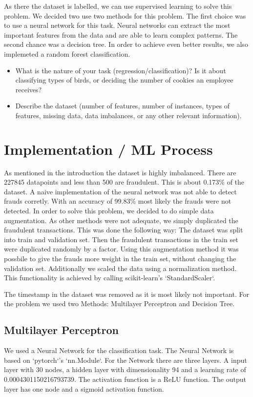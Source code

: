 \documentclass[a4paper, 10pt, conference]{ieeeconf}      %
\begin{document}
As there the dataset is labelled, we can use supervised learning to solve this problem. We decided two use two methods for this problem. 
The first choice was to use a neural network for this task. Neural networks can extract the most important features from the data and are able to learn complex patterns. 
The second chance was a decision tree. In order to achieve even better results, we also implemeted a random forest classification.


 
{\color{blue}

\begin{itemize}
	\item What is the nature of your task (regression/classification)? Is it about classifying types of birds, or deciding the number of cookies an employee receives?
	\item Describe the dataset (number of features, number of instances, types of features, missing data, data imbalances, or any other relevant information).
\end{itemize}
}


\section{Implementation / ML Process}
\label{sec:methods}
As mentioned in the introduction the dataset is highly imbalanced. There are 227845 datapoints and less than 500 are fraudulent. This is about 0.173\% of the dataset. 
A naive implementation of the neural network was not able to detect frauds corretly. With an accuracy of 99.83\% most likely the frauds were not detected. 
In order to solve this problem, we decided to do simple data augmentation. As other methods were not adequate, we simply duplicated the fraudulent transactions.
This was done the following way: The dataset was split into train and validation set. Then the fraudulent transactions in the train set were duplicated randomly by a factor. 
Using this augmentation method it was possbile to give the frauds more weight in the train set, without changing the validation set. 
Additionally we scaled the data using a normalization method. This functionality is achieved by calling scikit-learn's `StandardScaler`. 

The timestamp in the dataset was removed as it is most likely not important. 
For the problem we used two Methods: Multilayer Perceptron and Decision Tree. 

\subsection{Multilayer Perceptron}
We used a Neural Network for the classification task. The Neural Network is based on `pytorch`'s `nn.Module`. For the Network there are three layers. 
A input layer with 30 nodes, a hidden layer with dimensionality 94 and a learning rate of 0.0004301150216793739. 
The activation function is a ReLU function. The output layer has one node and a sigmoid activation function. %
\end{document}
